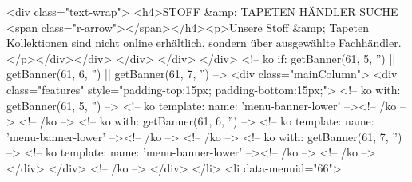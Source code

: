 <div class="text-wrap">
<h4>STOFF &amp; TAPETEN HÄNDLER SUCHE <span class="r-arrow"></span></h4><p>Unsere Stoff &amp; Tapeten Kollektionen sind nicht online erhältlich, sondern über ausgewählte Fachhändler.</p></div></div>
</div>
</div>
</div>
<!-- ko if: getBanner(61, 5, '') || getBanner(61, 6, '') || getBanner(61, 7, '') -->
<div class="mainColumn">
<div class="features" style="padding-top:15px; padding-bottom:15px;">
<!-- ko with: getBanner(61, 5, '') -->
<!-- ko template: { name: 'menu-banner-lower' } --><!-- /ko -->
<!-- /ko -->
<!-- ko with: getBanner(61, 6, '') -->
<!-- ko template: { name: 'menu-banner-lower' } --><!-- /ko -->
<!-- /ko -->
<!-- ko with: getBanner(61, 7, '') -->
<!-- ko template: { name: 'menu-banner-lower' } --><!-- /ko -->
<!-- /ko -->
</div>
</div>
<!-- /ko -->
</div>
</li>
<li data-menuid="66">

